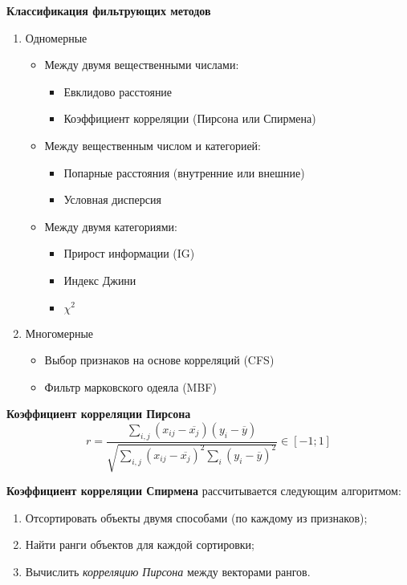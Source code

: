 \textbf{Классификация фильтрующих методов}
\begin{enumerate}
    \item Одномерные
    \begin{itemize}
        \item Между двумя вещественными числами:
        \begin{itemize}
            \item Евклидово расстояние
            \item Коэффициент корреляции (Пирсона или Спирмена)
        \end{itemize}
        \item Между вещественным числом и категорией:
        \begin{itemize}
            \item Попарные расстояния (внутренние или внешние)
            \item Условная дисперсия
        \end{itemize}
        \item Между двумя категориями:
        \begin{itemize}
            \item Прирост информации (IG)
            \item Индекс Джини
            \item $\chi^2$
        \end{itemize}
    \end{itemize}
    \item Многомерные
    \begin{itemize}
        \item Выбор признаков на основе корреляций (CFS)
        \item Фильтр марковского одеяла (MBF)
    \end{itemize}
\end{enumerate}

\begin{definition}
    \textbf{Коэффициент корреляции Пирсона}
    \[
        r=\dfrac{\sum_{i,j}(x_{ij}-\overline{x_j})(y_i-\overline{y})}{\sqrt{\sum_{i,j}(x_{ij}-\overline{x_j})^2\sum_i(y_i-\overline{y})^2}}\in[-1;1]
    \]
\end{definition}

\begin{definition}
    \textbf{Коэффициент корреляции Спирмена} рассчитывается следующим алгоритмом:
    \begin{enumerate}
        \item Отсортировать объекты двумя способами (по каждому из признаков);
        \item Найти ранги объектов для каждой сортировки;
        \item Вычислить \textit{корреляцию Пирсона} между векторами рангов.
    \end{enumerate}
\end{definition}

